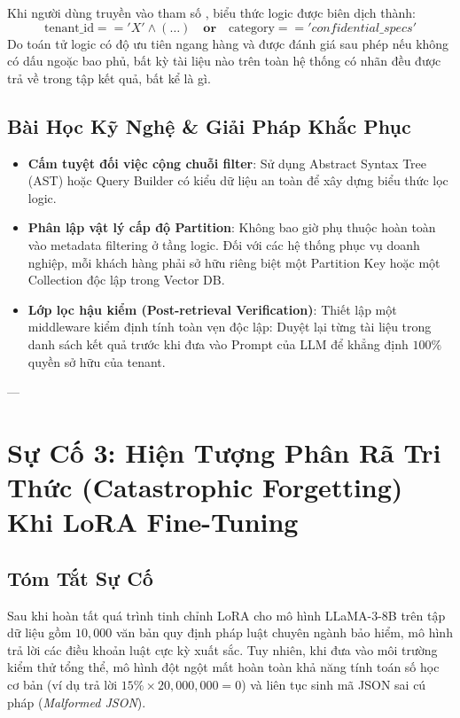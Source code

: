 Khi người dùng truyền vào tham số , biểu thức logic được biên dịch thành:
\begin{equation*}
\text{tenant\_id} == 'X' \land (\dots) \quad \mathbf{or} \quad \text{category} == 'confidential\_specs'
\end{equation*}
Do toán tử logic  có độ ưu tiên ngang hàng và được đánh giá sau phép  nếu không có dấu ngoặc bao phủ, bất kỳ tài liệu nào trên toàn hệ thống có nhãn  đều được trả về trong tập kết quả, bất kể  là gì.

\subsection{Bài Học Kỹ Nghệ \& Giải Pháp Khắc Phục}
\begin{itemize}
  \item \textbf{Cấm tuyệt đối việc cộng chuỗi filter}: Sử dụng Abstract Syntax Tree (AST) hoặc Query Builder có kiểu dữ liệu an toàn để xây dựng biểu thức lọc logic.
  \item \textbf{Phân lập vật lý cấp độ Partition}: Không bao giờ phụ thuộc hoàn toàn vào metadata filtering ở tầng logic. Đối với các hệ thống phục vụ doanh nghiệp, mỗi khách hàng phải sở hữu riêng biệt một Partition Key hoặc một Collection độc lập trong Vector DB.
  \item \textbf{Lớp lọc hậu kiểm (Post-retrieval Verification)}: Thiết lập một middleware kiểm định tính toàn vẹn độc lập: Duyệt lại từng tài liệu trong danh sách kết quả trước khi đưa vào Prompt của LLM để khẳng định $100\%$ quyền sở hữu của tenant.
\end{itemize}

---

\section{Sự Cố 3: Hiện Tượng Phân Rã Tri Thức (Catastrophic Forgetting) Khi LoRA Fine-Tuning}
\label{sec:postmortem-catastrophic-forgetting}

\subsection{Tóm Tắt Sự Cố}
Sau khi hoàn tất quá trình tinh chỉnh LoRA cho mô hình LLaMA-3-8B trên tập dữ liệu gồm $10,000$ văn bản quy định pháp luật chuyên ngành bảo hiểm, mô hình trả lời các điều khoản luật cực kỳ xuất sắc. Tuy nhiên, khi đưa vào môi trường kiểm thử tổng thể, mô hình đột ngột mất hoàn toàn khả năng tính toán số học cơ bản (ví dụ trả lời $15\% \times 20,000,000 = 0$) và liên tục sinh mã JSON sai cú pháp (\textit{Malformed JSON}).


